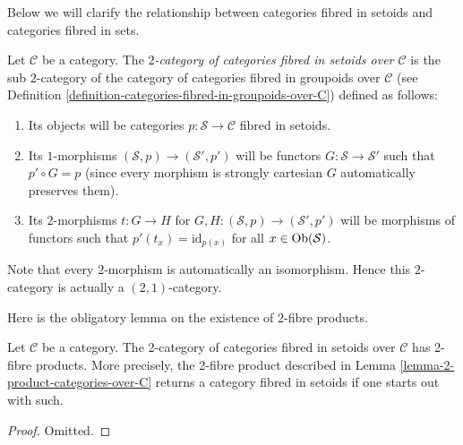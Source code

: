 \noindent
Below we will clarify the relationship between categories fibred in setoids
and categories fibred in sets.

\begin{definition}
\label{definition-categories-fibred-in-setoids-over-C}
Let $\mathcal{C}$ be a category.
The {\it $2$-category of categories fibred in setoids over $\mathcal{C}$}
is the sub $2$-category of the category of categories fibred in groupoids
over $\mathcal{C}$ (see
Definition \ref{definition-categories-fibred-in-groupoids-over-C})
defined as follows:
\begin{enumerate}
\item Its objects will be categories
$p : \mathcal{S} \to \mathcal{C}$ fibred in setoids.
\item Its $1$-morphisms $(\mathcal{S}, p) \to (\mathcal{S}', p')$
will be functors $G : \mathcal{S} \to \mathcal{S}'$ such that
$p' \circ G = p$ (since every morphism is strongly cartesian
$G$ automatically preserves them).
\item Its $2$-morphisms $t : G \to H$ for
$G, H : (\mathcal{S}, p) \to (\mathcal{S}', p')$
will be morphisms of functors
such that $p'(t_x) = \text{id}_{p(x)}$
for all $x \in \mathop{\mathrm{Ob}}\nolimits(\mathcal{S})$.
\end{enumerate}
\end{definition}

\noindent
Note that every $2$-morphism is automatically an isomorphism.
Hence this $2$-category is actually a $(2, 1)$-category.

\noindent
Here is the obligatory lemma on the existence of $2$-fibre products.

\begin{lemma}
\label{lemma-2-product-categories-fibred-setoids}
Let $\mathcal{C}$ be a category.
The 2-category of categories fibred in setoids over $\mathcal{C}$
has 2-fibre products. More precisely, the 2-fibre product described in
Lemma \ref{lemma-2-product-categories-over-C} returns a category fibred in
setoids if one starts out with such.
\end{lemma}

\begin{proof}
Omitted.
\end{proof}

